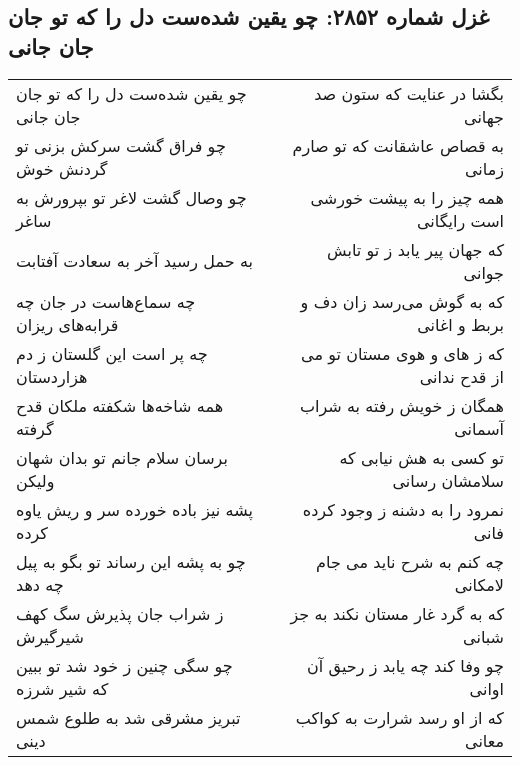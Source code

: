 \begin{center}
\section*{غزل شماره ۲۸۵۲: چو یقین شده‌ست دل را که تو جان جان جانی}
\label{sec:2852}
\begin{longtable}{l p{0.5cm} r}
چو یقین شده‌ست دل را که تو جان جان جانی
&&
بگشا در عنایت که ستون صد جهانی
\\
چو فراق گشت سرکش بزنی تو گردنش خوش
&&
به قصاص عاشقانت که تو صارم زمانی
\\
چو وصال گشت لاغر تو بپرورش به ساغر
&&
همه چیز را به پیشت خورشی است رایگانی
\\
به حمل رسید آخر به سعادت آفتابت
&&
که جهان پیر یابد ز تو تابش جوانی
\\
چه سماع‌هاست در جان چه قرابه‌های ریزان
&&
که به گوش می‌رسد زان دف و بربط و اغانی
\\
چه پر است این گلستان ز دم هزاردستان
&&
که ز های و هوی مستان تو می از قدح ندانی
\\
همه شاخه‌ها شکفته ملکان قدح گرفته
&&
همگان ز خویش رفته به شراب آسمانی
\\
برسان سلام جانم تو بدان شهان ولیکن
&&
تو کسی به هش نیابی که سلامشان رسانی
\\
پشه نیز باده خورده سر و ریش یاوه کرده
&&
نمرود را به دشنه ز وجود کرده فانی
\\
چو به پشه این رساند تو بگو به پیل چه دهد
&&
چه کنم به شرح ناید می جام لامکانی
\\
ز شراب جان پذیرش سگ کهف شیرگیرش
&&
که به گرد غار مستان نکند به جز شبانی
\\
چو سگی چنین ز خود شد تو ببین که شیر شرزه
&&
چو وفا کند چه یابد ز رحیق آن اوانی
\\
تبریز مشرقی شد به طلوع شمس دینی
&&
که از او رسد شرارت به کواکب معانی
\\
\end{longtable}
\end{center}
